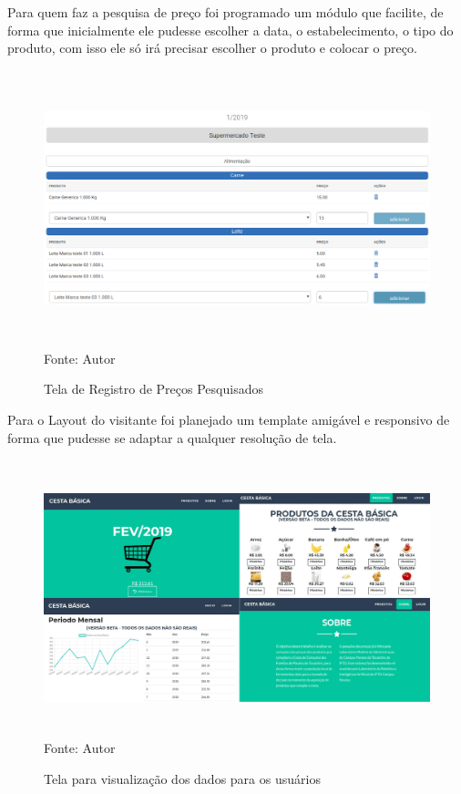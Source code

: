 \documentclass{ifto-tex}
\begin{document}
Para quem faz a pesquisa de preço foi programado um módulo que facilite, de forma que inicialmente ele pudesse escolher a data, o estabelecimento, o tipo do produto, com isso ele só irá precisar escolher o produto e colocar o preço.

\begin{figure}[H]
	\begin{center}
		\includegraphics[width=16.0cm, height= 8.0cm]{cestacadastro.png}    %
		Fonte: Autor
		\caption{Tela de Registro de Preços Pesquisados} 
		\label{fig:faces}
	\end{center}
\end{figure}

Para o Layout do visitante foi planejado um template amigável e responsivo de forma que pudesse se adaptar a qualquer resolução de tela.


\begin{figure}[!h]
	\begin{center}
		\includegraphics[width=16.0cm, height= 8.0cm]{cestauser.jpeg}    %
		Fonte: Autor
		\caption{Tela para visualização dos dados para os usuários} 
		\label{fig:faces}
	\end{center}
\end{figure}
\end{document}
